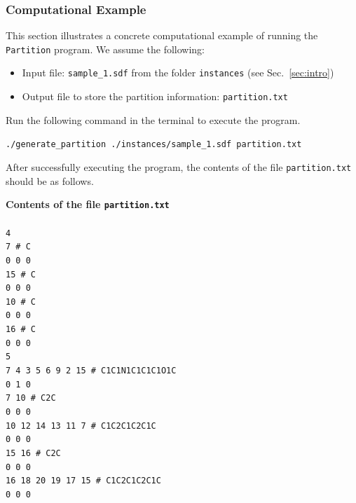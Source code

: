 \documentclass[11pt,titlepage,dvipdfmx,twoside]{book}
\begin{document}
\subsubsection{Computational Example}
\label{sec:instance_p}

This section illustrates a concrete computational 
example of running the {\tt Partition} program.
We assume the following:
%
\begin{itemize}
\item Input file: {\tt sample\_1.sdf} from the folder {\tt instances} (see Sec.~\ref{sec:intro})
\item Output file to store the partition information: {\tt partition.txt}
\end{itemize}

Run the following command in the terminal to execute the program.

\bigskip

{\tt ./generate\_partition ./instances/sample\_1.sdf partition.txt}

\bigskip

After successfully executing the program, the contents of the file 
{\tt partition.txt} should be as follows.

\begin{oframed}
{\bf Contents of the file {\tt partition.txt}}\\\\
{\tt 4 \\
7 \# C \\
0 0 0 \\
15 \# C \\
0 0 0 \\
10 \# C \\
0 0 0 \\
16 \# C \\
0 0 0 \\
5 \\
7 4 3 5 6 9 2 15 \# C1C1N1C1C1C1O1C \\
0 1 0 \\
7 10 \# C2C \\
0 0 0 \\
10 12 14 13 11 7 \# C1C2C1C2C1C \\
0 0 0 \\
15 16 \# C2C \\
0 0 0 \\
16 18 20 19 17 15 \# C1C2C1C2C1C \\
0 0 0 \\}
\end{oframed}
\end{document}
